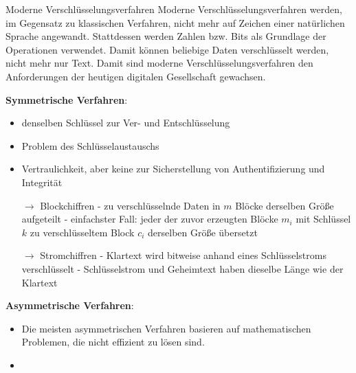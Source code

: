 \documentclass[german]{spicker}
\begin{document}
\begin{defi}{Moderne Verschlüsselungsverfahren}
    Moderne Verschlüsselungsverfahren werden, im Gegensatz zu klassischen Verfahren,
    nicht mehr auf Zeichen einer natürlichen Sprache angewandt. Stattdessen werden
    Zahlen bzw. Bits als Grundlage der Operationen verwendet. Damit können
    beliebige Daten verschlüsselt werden, nicht mehr nur Text. Damit sind moderne
    Verschlüsselungsverfahren den Anforderungen der heutigen digitalen Gesellschaft
    gewachsen.

    \textbf{Symmetrische Verfahren}:
    \begin{itemize}
        \item denselben Schlüssel zur Ver- und Entschlüsselung
        \item Problem des Schlüsselaustauschs
        \item Vertraulichkeit, aber keine zur Sicherstellung von Authentifizierung und Integrität
        \item[$\to$] Blockchiffren
              \subitem -  zu verschlüsselnde Daten in $m$ Blöcke derselben Größe aufgeteilt
              \subitem -  einfachster Fall: jeder der zuvor erzeugten Blöcke $m_i$ mit Schlüssel $k$
              \subitem zu verschlüsseltem Block $c_i$ derselben Größe übersetzt
        \item[$\to$] Stromchiffren
              \subitem -  Klartext wird bitweise anhand eines Schlüsselstroms verschlüsselt
              \subitem - Schlüsselstrom und Geheimtext haben dieselbe Länge wie der Klartext
    \end{itemize}

    \textbf{Asymmetrische Verfahren}:
    \begin{itemize}
        \item Die meisten asymmetrischen Verfahren basieren auf mathematischen Problemen, die nicht effizient zu lösen sind.
        \item
    \end{itemize}
\end{defi}
\end{document}
